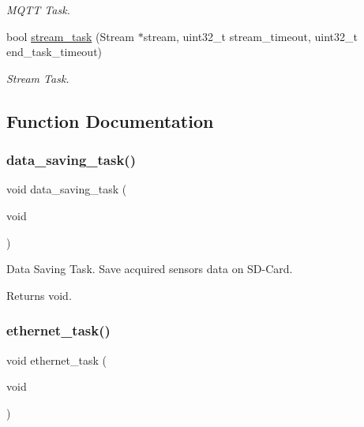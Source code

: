 \begin{DoxyCompactItemize}
\begin{DoxyCompactList}\small\item\em M\+Q\+TT Task. \end{DoxyCompactList}\item 
bool \hyperlink{rmap_8ino_a21575354e8ec54fa31f581ed1838be79}{stream\+\_\+task} (Stream $\ast$stream, uint32\+\_\+t stream\+\_\+timeout, uint32\+\_\+t end\+\_\+task\+\_\+timeout)
\begin{DoxyCompactList}\small\item\em Stream Task. \end{DoxyCompactList}\end{DoxyCompactItemize}


\subsection{Function Documentation}
\mbox{\label{rmap_8ino_a1c6cee0cbd43bbe1215f13cab2434347}} 
\subsubsection{\texorpdfstring{data\+\_\+saving\+\_\+task()}{data\_saving\_task()}}
{\footnotesize\ttfamily void data\+\_\+saving\+\_\+task (\begin{DoxyParamCaption}\item[{void}]{ }\end{DoxyParamCaption})}



Data Saving Task. Save acquired sensors data on S\+D-\/\+Card. 

\begin{DoxyReturn}{Returns}
void. 
\end{DoxyReturn}
\mbox{\label{rmap_8ino_abac8959915b759aa6429243ab9599ee3}} 
\subsubsection{\texorpdfstring{ethernet\+\_\+task()}{ethernet\_task()}}
{\footnotesize\ttfamily void ethernet\+\_\+task (\begin{DoxyParamCaption}\item[{void}]{ }\end{DoxyParamCaption})}



